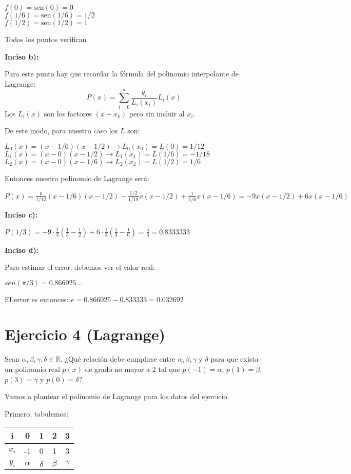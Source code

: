 \documentclass[11pt]{article}
\def\sen{\mathrm{sen}}
\begin{document}
	$f(0)=\sen(0)=0$\\
	$f(1/6)=\sen(1/6)=1/2$\\
	$f(1/2)=\sen(1/2)=1$
	
	Todos los puntos verifican
	
	\textbf{Inciso b):}
	
	Para este punto hay que recordar la fórmula del polinomio interpolante de Lagrange:
	$$\displaystyle P(x)=\sum_{i=0}^{n}\frac{y_i}{L_i(x_i)}L_i(x)$$
	Los $L_i(x)$ son los factores $(x-x_k)$ pero sin incluir al $x_i$.
	
	De este modo, para nuestro caso los $L$ son:
	
	$L_0(x)=(x-1/6)(x-1/2) \rightarrow L_0(x_0)=L(0)=1/12$\\
	$L_1(x)=(x-0)(x-1/2) \rightarrow L_1(x_1)=L(1/6)=-1/18$\\
	$L_2(x)=(x-0)(x-1/6) \rightarrow L_2(x_2)=L(1/2)=1/6$
	
	Entonces nuestro polinomio de Lagrange será:
	
	$\displaystyle P(x)=\frac{0}{1/12}(x-1/6)(x-1/2)-\frac{1/2}{1/18}x(x-1/2)+\frac{1}{1/6}x(x-1/6)=-9x(x-1/2)+6x(x-1/6)$
	
	\textbf{Inciso c):}
	
	$\displaystyle P(1/3)=-9\cdot\frac{1}{3}\left( \frac{1}{3}-\frac{1}{2} \right) + 6 \cdot \frac{1}{3}\left(\frac{1}{3}-\frac{1}{6}\right)=\frac{5}{6}=0.8333333$
	
	\textbf{Inciso d):}
	
	Para estimar el error, debemos ver el valor real:
	
	$sen(\pi/3)=0.866025...$
	
	El error es entonces: $e=0.866025-0.833333=0.032692$
	
	\section{Ejercicio 4 (Lagrange)}
	Sean $\alpha, \beta, \gamma, \delta \in \mathbb{R}$. ¿Qué relación debe cumplirse entre $\alpha, \beta, \gamma \text{ y } \delta$ para que exista un polinomio real $p(x)$ de grado no mayor a 2 tal que $p(-1)=\alpha$, $p(1)=\beta$, $p(3)=\gamma$ y $p(0)=\delta$?
	
	Vamos a plantear el polinomio de Lagrange para los datos del ejercicio.
	
	Primero, tabulemos:
	
	\begin{tabular}{|c|c|c|c|c|}
		\hline
		i & 0 & 1 & 2 & 3\\
		\hline
		$x_i$ & -1 & 0 & 1 & 3\\
		\hline
		$y_i$ & $\alpha$ & $\delta$ & $\beta$ & $\gamma$\\
		\hline
	\end{tabular}
\end{document}
